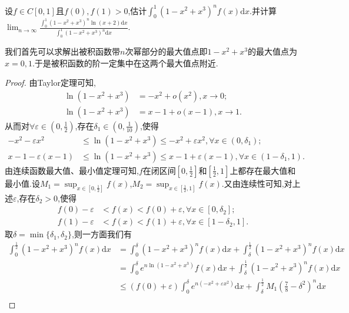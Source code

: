 \documentclass[../../main.tex]{subfiles}%
\begin{document}
\begin{example}\label{Laplace方法例题4}
设\(f\in C[0,1]\)且$f(0),f(1)>0$,估计$\int_0^1{(1 - x^2 + x^3)^nf(x)\mathrm{d}x}$.并计算$\lim_{n\rightarrow \infty} \frac{\int_0^1{\left( 1-x^2+x^3 \right) ^n\ln \left( x+2 \right) \mathrm{d}x}}{\int_0^1{\left( 1-x^2+x^3 \right) ^n\mathrm{d}x}}.$
\end{example}
\begin{note}
我们首先可以求解出被积函数带$n$次幂部分的最大值点即$1-x^2+x^3$的最大值点为$x=0,1$.于是被积函数的阶一定集中在这两个最大值点附近.
\end{note}
\begin{proof}

由Taylor定理可知,
\begin{align*}
\ln(1 - x^2 + x^3) &= -x^2 + o(x^2),  x\rightarrow 0;\\
\ln(1 - x^2 + x^3) &= x - 1 + o(x - 1),  x\rightarrow 1.
\end{align*}
从而对\(\forall \varepsilon \in (0,\frac{1}{2})\),存在\(\delta_1 \in (0,\frac{1}{10})\),使得
\begin{align*}
-x^2 - \varepsilon x^2&\leqslant\ln(1 - x^2 + x^3)\leqslant -x^2 + \varepsilon x^2, \forall x\in (0,\delta_1);\\
x - 1 - \varepsilon(x - 1)&\leqslant\ln(1 - x^2 + x^3)\leqslant x - 1 + \varepsilon(x - 1), \forall x\in (1 - \delta_1,1).
\end{align*}
由连续函数最大值、最小值定理可知,\(f\)在闭区间\([0,\frac{1}{2}]\)和$[\frac{1}{2},1]$上都存在最大值和最小值.设\(M_1 = \sup_{x\in [0,\frac{1}{2}]}f(x)\),\(M_2 = \sup_{x\in [\frac{1}{2},1]}f(x)\).又由连续性可知,对上述\(\varepsilon\),存在\(\delta_2>0\),使得
\begin{align*}
f(0) - \varepsilon&< f(x) < f(0) + \varepsilon, \forall x\in [0,\delta_2];\\
f(1) - \varepsilon&< f(x) < f(1) + \varepsilon, \forall x\in [1 - \delta_2,1].
\end{align*}
取\(\delta = \min\{\delta_1,\delta_2\}\),则一方面我们有
\begin{align*}
\int_0^{\frac{1}{2}}{(1 - x^2 + x^3)^nf(x)\mathrm{d}x}&=\int_0^{\delta}{(1 - x^2 + x^3)^nf(x)\mathrm{d}x}+\int_{\delta}^{\frac{1}{2}}{(1 - x^2 + x^3)^nf(x)\mathrm{d}x}\\
&=\int_0^{\delta}{e^{n\ln(1 - x^2 + x^3)}f(x)\mathrm{d}x}+\int_{\delta}^{\frac{1}{2}}{(1 - x^2 + x^3)^nf(x)\mathrm{d}x}\\
&\leqslant (f(0) + \varepsilon)\int_0^{\delta}{e^{n(-x^2 + \varepsilon x^2)}\mathrm{d}x}+\int_{\delta}^{\frac{1}{2}}{M_1\left(\frac{7}{8}-\delta^2\right)^n\mathrm{d}x}\\

\end{align*}
\end{proof}
\end{document}
